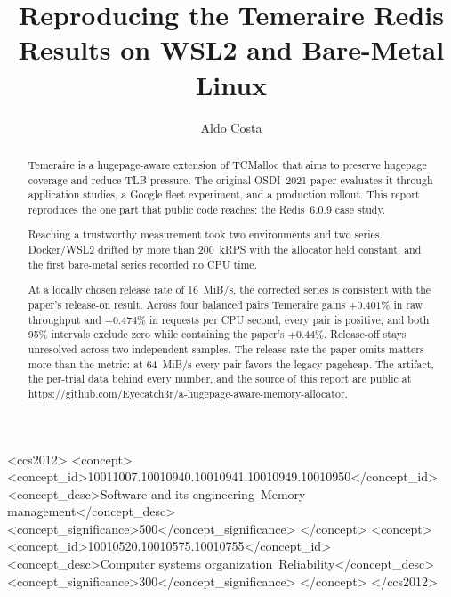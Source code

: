 \documentclass[sigconf]{acmart}
\begin{document}
\raggedbottom

\title{Reproducing the Temeraire Redis Results on WSL2 and Bare-Metal Linux}

\author{Aldo Costa}

\renewcommand{\shortauthors}{Costa}

\begin{abstract}
Temeraire is a hugepage-aware extension of TCMalloc that aims to preserve
hugepage coverage and reduce TLB pressure. The original OSDI~2021 paper
evaluates it through application studies, a Google fleet experiment, and a
production rollout. This report reproduces the one part that public code
reaches: the Redis~6.0.9 case study.

Reaching a trustworthy measurement took two environments and two series.
Docker/WSL2 drifted by more than 200~kRPS with the allocator held constant,
and the first bare-metal series recorded no CPU time.

At a locally chosen release rate of 16~MiB/s, the corrected series is
consistent with the paper's release-on result. Across four
balanced pairs Temeraire gains $+0.401\%$ in raw throughput and $+0.474\%$ in
requests per CPU second, every pair is positive, and both 95\% intervals
exclude zero while containing the paper's $+0.44\%$. Release-off stays
unresolved across two independent samples. The release rate the paper omits
matters more than the metric: at 64~MiB/s every pair favors the legacy
pageheap. The artifact, the per-trial data behind every number, and the source
of this report are public at
\url{https://github.com/Eyecatch3r/a-hugepage-aware-memory-allocator}.
\end{abstract}

\begin{CCSXML} <ccs2012> <concept>
<concept_id>10011007.10010940.10010941.10010949.10010950</concept_id>
<concept_desc>Software and its engineering~Memory management</concept_desc>
<concept_significance>500</concept_significance> </concept> <concept>
<concept_id>10010520.10010575.10010755</concept_id>
<concept_desc>Computer systems organization~Reliability</concept_desc>
<concept_significance>300</concept_significance> </concept> </ccs2012>
\end{CCSXML}

\end{document}

